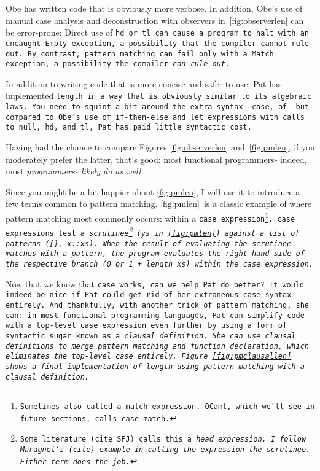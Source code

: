 \documentclass[manuscript,screen,review, 12pt]{acmart}
\begin{document}
    Obe has written code that is obviously more verbose. In addition, Obe's use
    of manual case analysis and deconstruction with observers
    in~\ref{fig:observerlen} can be error-prone: Direct use of \tt{hd} or
    \tt{tl} can cause a program to halt with an uncaught \tt{Empty} exception, a
    possibility that the compiler cannot rule out. By contrast, pattern matching
    can fail only with a \tt{Match} exception, a possibility the compiler
    \it{can} rule out. 
    
    In addition to writing code that is more concise and safer to use, Pat has
    implemented \tt{length} in a way that is obviously similar to its algebraic
    laws. You need to squint a bit around the extra syntax- \tt{case}, \tt{of}-
    but compared to Obe's use of \tt{if-then-else} and \tt{let} expressions with
    calls to \tt{null}, \tt{hd}, and \tt{tl}, Pat has paid little syntactic
    cost. 

    Having had the chance to compare Figures \ref{fig:observerlen}
    and~\ref{fig:pmlen}, if you moderately prefer the latter, that's good: most
    functional programmers- indeed, most \it{programmers}- likely do as well. 

    Since you might be a bit happier about \ref{fig:pmlen}, I will use it to
    introduce a few terms common to pattern matching. \ref{fig:pmlen}~is a
    classic example of where pattern matching most commonly occurs: within a
    \tt{case} expression\footnote{Sometimes also called a \tt{match expression}.
    OCaml, which we'll see in future sections, calls \tt{case} \tt{match}.}.
    \tt{case} expressions test a \it{scrutinee}\footnote{Some literature (cite
    SPJ) calls this a \it{head expression}. I follow Maragnet's (cite) example
    in calling the expression the \it{scrutinee}. Either term does the job.}
    (\tt{ys} in~\ref{fig:pmlen}) against a list of patterns (\tt{[]},
    \tt{x::xs}). When the result of evaluating the scrutinee matches with a
    pattern, the program evaluates the right-hand side of the respective branch
    (\tt{0} or \tt{1 + length xs}) within the \tt{case} expression. 

    Now that we know that \tt{case} works, can we help Pat do better? It would
    indeed be nice if Pat could get rid of her extraneous \tt{case} syntax
    entirely. And thankfully, with another trick of pattern matching, she can:
    in most functional programming languages, Pat can simplify code with a
    top-level \tt{case} expression even further by using a form of syntactic
    sugar known as a \it{clausal definition}. She can use clausal definitions to
    merge pattern matching and function declaration, which eliminates the
    top-level \tt{case} entirely. Figure~\ref{fig:pmclausallen} shows a final
    implementation of \tt{length} using pattern matching with a clausal
    definition. 
    
\end{document}
